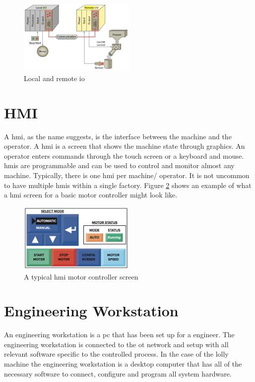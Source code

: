     \begin{figure}[H]
        \centering
        \includegraphics[width = 0.5\textwidth]{2_images/localRemoteIo.png}
        \caption{Local and remote \acrshort{io}}
        \label{fig:localRemoteIo}
    \end{figure}
 
\section{HMI}
    A \acrfull{hmi}, as the name suggests, is the interface between the machine and the operator. A \acrshort{hmi} is a screen that shows the machine state through graphics. An operator enters commands through the touch screen or a keyboard and mouse. \acrshort{hmi}s are programmable and can be used to control and monitor almost any machine\cite{petruzella2017programmable}. Typically, there is one \acrshort{hmi} per machine/ operator. It is not uncommon to have multiple \acrshort{hmi}s within a single factory. Figure \ref{fig:typHmi} shows an example of what a \acrshort{hmi} screen for a basic motor controller might look like.

    \begin{figure}[H]
        \centering
        \includegraphics[width = 0.5\textwidth]{2_images/typicalHmi.png}
        \caption{A typical \acrshort{hmi} motor controller screen\cite{petruzella2017programmable}}
        \label{fig:typHmi}
    \end{figure}    
    
\section{Engineering Workstation}
    An engineering workstation is a \acrshort{pc} that has been set up for a engineer. The engineering workstation is connected to the \acrshort{ot} network and setup with all relevant software specific to the controlled process. In the case of the lolly machine the engineering workstation is a desktop computer that has all of the necessary  software to connect, configure and program all system hardware. 
